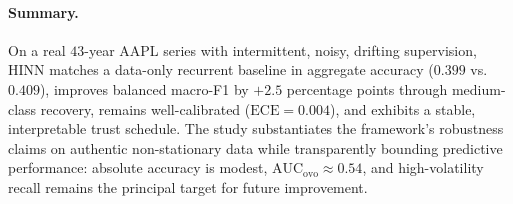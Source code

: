 \paragraph{Summary.}
On a real $43$-year AAPL series with intermittent, noisy, drifting supervision,
HINN matches a data-only recurrent baseline in aggregate accuracy
($0.399$ vs.\ $0.409$), improves balanced macro-F1 by $+2.5$ percentage points
through medium-class recovery, remains well-calibrated
($\mathrm{ECE}=0.004$), and exhibits a stable, interpretable trust schedule. The
study substantiates the framework's robustness claims on authentic
non-stationary data while transparently bounding predictive performance: absolute
accuracy is modest, $\mathrm{AUC}_{\mathrm{ovo}}\approx 0.54$, and high-volatility
recall remains the principal target for future improvement.
